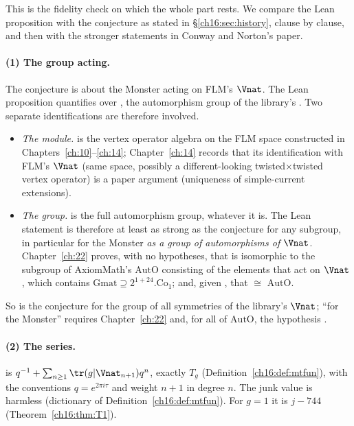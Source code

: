 This is the fidelity check on which the whole part rests.  We compare the Lean proposition with the conjecture as
stated in \S\ref{ch16:sec:history}, clause by clause, and then with the stronger statements in Conway and Norton's
paper.

\paragraph{(1) The group acting.}  The conjecture is about the Monster acting on FLM's $\Vnat$.  The Lean proposition
quantifies over , the automorphism group of the library's .  Two separate identifications
are therefore involved.
\begin{itemize}
\item \emph{The module.}   is the vertex operator algebra on the FLM space constructed in
  Chapters~\ref{ch:10}--\ref{ch:14}; Chapter~\ref{ch:14} records that its identification with FLM's $\Vnat$ (same
  space, possibly a different-looking twisted$\times$twisted vertex operator) is a paper argument (uniqueness of
  simple-current extensions).
\item \emph{The group.}   is the full automorphism group, whatever it is.  The Lean statement is
  therefore at least as strong as the conjecture for any subgroup, in particular for the Monster \emph{as a group of
  automorphisms of $\Vnat$}.  Chapter~\ref{ch:22} proves, with no hypotheses, that  is isomorphic to the
  subgroup of AxiomMath's $\mathrm{AutO}$ consisting of the elements that act on $\Vnat$, which contains
  $\mathrm{Gmat}\supseteq2^{1+24}.\mathrm{Co}_1$; and, given , that  $\cong$
  $\mathrm{AutO}$.
\end{itemize}
So  is the conjecture for the group of all symmetries of the library's $\Vnat$; ``for the
Monster'' requires Chapter~\ref{ch:22} and, for all of $\mathrm{AutO}$, the hypothesis .

\paragraph{(2) The series.}   is $q^{-1}+\sum_{n\ge1}\tr(g|\Vnat_{n+1})q^n$, exactly
$T_g$ (Definition~\ref{ch16:def:mtfun}), with the conventions $q=e^{2\pi i\tau}$ and weight $n+1$ in degree $n$.  The
 junk value is harmless (dictionary of Definition~\ref{ch16:def:mtfun}).  For $g=1$ it is $j-744$
(Theorem~\ref{ch16:thm:T1}).

